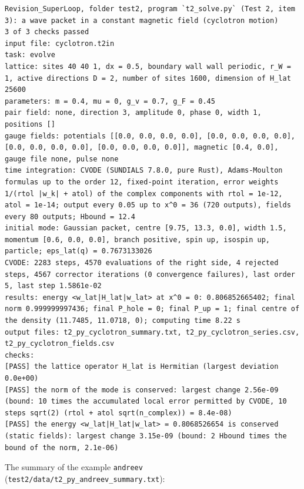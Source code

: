 \documentclass[
  10pt,
]{article}
\begin{document}
\begin{verbatim}
Revision_SuperLoop, folder test2, program `t2_solve.py` (Test 2, item 3): a wave packet in a constant magnetic field (cyclotron motion)
3 of 3 checks passed
input file: cyclotron.t2in
task: evolve
lattice: sites 40 40 1, dx = 0.5, boundary wall wall periodic, r_W = 1, active directions D = 2, number of sites 1600, dimension of H_lat 25600
parameters: m = 0.4, mu = 0, g_v = 0.7, g_F = 0.45
pair field: none, direction 3, amplitude 0, phase 0, width 1, positions []
gauge fields: potentials [[0.0, 0.0, 0.0, 0.0], [0.0, 0.0, 0.0, 0.0], [0.0, 0.0, 0.0, 0.0], [0.0, 0.0, 0.0, 0.0]], magnetic [0.4, 0.0], gauge file none, pulse none
time integration: CVODE (SUNDIALS 7.8.0, pure Rust), Adams-Moulton formulas up to the order 12, fixed-point iteration, error weights 1/(rtol |w_k| + atol) of the complex components with rtol = 1e-12, atol = 1e-14; output every 0.05 up to x^0 = 36 (720 outputs), fields every 80 outputs; Hbound = 12.4
initial mode: Gaussian packet, centre [9.75, 13.3, 0.0], width 1.5, momentum [0.6, 0.0, 0.0], branch positive, spin up, isospin up, particle; eps_lat(q) = 0.7673133026
CVODE: 2283 steps, 4570 evaluations of the right side, 4 rejected steps, 4567 corrector iterations (0 convergence failures), last order 5, last step 1.5861e-02
results: energy <w_lat|H_lat|w_lat> at x^0 = 0: 0.806852665402; final norm 0.999999997436; final P_hole = 0; final P_up = 1; final centre of the density (11.7485, 11.0718, 0); computing time 8.22 s
output files: t2_py_cyclotron_summary.txt, t2_py_cyclotron_series.csv, t2_py_cyclotron_fields.csv
checks:
[PASS] the lattice operator H_lat is Hermitian (largest deviation 0.0e+00)
[PASS] the norm of the mode is conserved: largest change 2.56e-09 (bound: 10 times the accumulated local error permitted by CVODE, 10 steps sqrt(2) (rtol + atol sqrt(n_complex)) = 8.4e-08)
[PASS] the energy <w_lat|H_lat|w_lat> = 0.8068526654 is conserved (static fields): largest change 3.15e-09 (bound: 2 Hbound times the bound of the norm, 2.1e-06)
\end{verbatim}

The summary of the example \texttt{andreev}
(\texttt{test2/data/t2\_py\_andreev\_summary.txt}):
\end{document}
